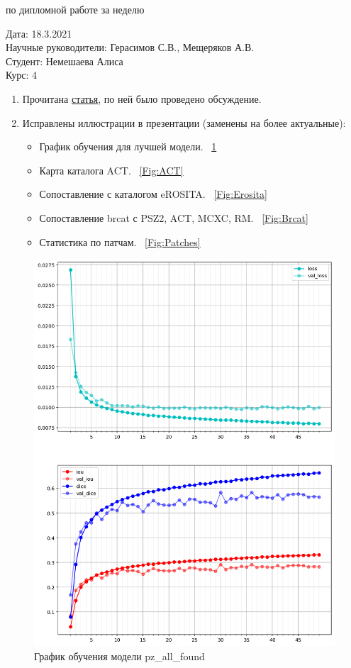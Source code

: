 \documentclass{article}
\begin{document}
\begin{center}{ по дипломной работе за неделю\\}\end{center}
Дата: 18.3.2021\\
Научные руководители: Герасимов С.В., Мещеряков А.В.\\
Студент: Немешаева Алиса\\
Курс: 4\\

\renewcommand{\labelitemi}{$\blacksquare$}
\renewcommand\labelitemii{$\square$}
\begin{enumerate}
    \item Прочитана  \href{https://arxiv.org/pdf/2102.13123.pdf}{статья}, по ней было проведено 
        обсуждение.\\
    \item Исправлены иллюстрации в презентации (заменены на более актуальные):
        \begin{itemize}
            \item График обучения для лучшей модели. ~\ref{Fig:Hist}{}\\
            \item Карта каталога ACT. ~\ref{Fig:ACT}{}\\
            \item Сопоставление с каталогом eROSITA. ~\ref{Fig:Erosita}\\ 
            \item Сопоставление brcat с PSZ2, ACT, MCXC, RM. ~\ref{Fig:Brcat}{}\\
            \item Статистика по патчам. ~\ref{Fig:Patches}{}\\
        \end{itemize}
\end{enumerate}




\begin{figure}[h]
\includegraphics[width=0.6\linewidth]{all_found_hist}
\caption{График обучения модели pz\_all\_found}
\label{Fig:Hist}
\end{figure}
\end{document}
